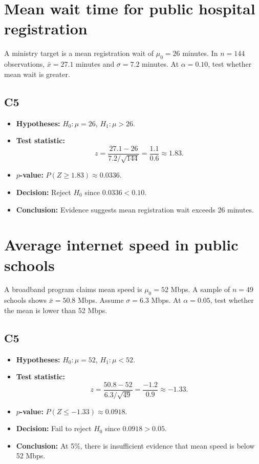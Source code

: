 \begin{ExamProblems}
\item
\section{Mean wait time for public hospital registration}
A ministry target is a mean registration wait of \(\mu_0=26\) minutes. In \(n=144\) observations, \(\bar x=27.1\) minutes and \(\sigma=7.2\) minutes. At \(\alpha=0.10\), test whether mean wait is greater.

\subsection*{C5}
\begin{itemize}
    \item \textbf{Hypotheses:} \(H_0\colon \mu=26\), \(H_1\colon \mu>26\).
    \item \textbf{Test statistic:}
    \[
    z=\frac{27.1-26}{7.2/\sqrt{144}}=\frac{1.1}{0.6}\approx 1.83.
    \]
    \item \textbf{\(p\)-value:} \(P(Z\ge 1.83)\approx 0.0336\).
    \item \textbf{Decision:} Reject \(H_0\) since \(0.0336<0.10\).
    \item \textbf{Conclusion:} Evidence suggests mean registration wait exceeds 26 minutes.
\end{itemize}

\item
\section{Average internet speed in public schools}
A broadband program claims mean speed is \(\mu_0=52\) Mbps. A sample of \(n=49\) schools shows \(\bar x=50.8\) Mbps. Assume \(\sigma=6.3\) Mbps. At \(\alpha=0.05\), test whether the mean is lower than 52 Mbps.

\subsection*{C5}
\begin{itemize}
    \item \textbf{Hypotheses:} \(H_0\colon \mu=52\), \(H_1\colon \mu<52\).
    \item \textbf{Test statistic:}
    \[
    z=\frac{50.8-52}{6.3/\sqrt{49}}=\frac{-1.2}{0.9}\approx -1.33.
    \]
    \item \textbf{\(p\)-value:} \(P(Z\le -1.33)\approx 0.0918\).
    \item \textbf{Decision:} Fail to reject \(H_0\) since \(0.0918>0.05\).
    \item \textbf{Conclusion:} At 5\%, there is insufficient evidence that mean speed is below 52 Mbps.
\end{itemize}

\end{ExamProblems}

